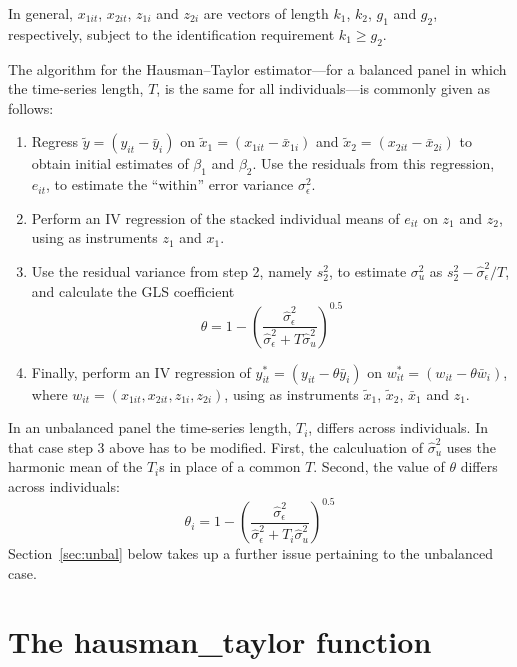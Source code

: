 \documentclass{article}
\begin{document}
In general, $x_{1it}$, $x_{2it}$, $z_{1i}$ and $z_{2i}$ are vectors
of length $k_1$, $k_2$, $g_1$ and $g_2$, respectively, subject to the
identification requirement $k_1 \geq g_2$.

The algorithm for the Hausman--Taylor estimator---for a balanced panel
in which the time-series length, $T$, is the same for all
individuals---is commonly given as follows:

\begin{enumerate}
\item Regress $\tilde{y} = (y_{it} - \bar{y}_i)$ on
  $\tilde{x}_1 = (x_{1it} - \bar{x}_{1i})$ and
  $\tilde{x}_2 = (x_{2it} - \bar{x}_{2i})$ to obtain initial estimates
  of $\beta_1$ and $\beta_2$. Use the residuals from this regression,
  $e_{it}$, to estimate the ``within'' error variance
  $\sigma^2_{\epsilon}$.
\item Perform an IV regression of the stacked individual means of
  $e_{it}$ on $z_1$ and $z_2$, using as instruments $z_1$ and $x_1$.
\item Use the residual variance from step 2, namely $s_2^2$, to
  estimate $\sigma^2_u$ as $s_2^2 - \hat{\sigma}^2_{\epsilon}/T$, and
  calculate the GLS coefficient
\begin{equation}
\label{eq:theta}
\theta = 1 - \left(\frac{\hat{\sigma}^2_{\epsilon}}
  {\hat{\sigma}^2_{\epsilon} + T\hat{\sigma}^2_u}\right)^{0.5}
\end{equation}
\item Finally, perform an IV regression of $y_{it}^* = (y_{it} -
  \theta\bar{y}_i)$ on $w_{it}^* = (w_{it} - \theta\bar{w}_{i})$,
  where $w_{it} = (x_{1it}, x_{2it}, z_{1i}, z_{2i})$, using as
  instruments $\tilde{x}_1$, $\tilde{x}_2$, $\bar{x}_{1}$ and
  $z_{1}$.
\end{enumerate}

In an unbalanced panel the time-series length, $T_i$, differs across
individuals. In that case step 3 above has to be modified. First, the
calculuation of $\hat{\sigma}^2_u$ uses the harmonic mean of the
$T_i$s in place of a common $T$. Second, the value of $\theta$ differs
across individuals:
%
\begin{equation}
\label{eq:theta-unbal}
\theta_i = 1 - \left(\frac{\hat{\sigma}^2_{\epsilon}}
  {\hat{\sigma}^2_{\epsilon} + T_i\hat{\sigma}^2_u}\right)^{0.5}
\end{equation}
%
Section~\ref{sec:unbal} below takes up a further issue pertaining to
the unbalanced case.

\section{The hausman\_taylor function}
\end{document}
